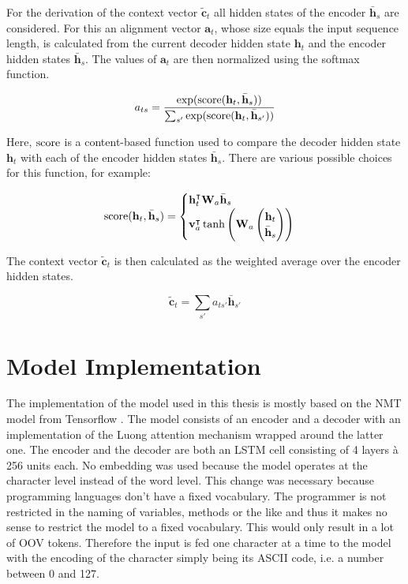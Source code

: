 For the derivation of the context vector \(\tilde{\mathbf{c}}_t\) all hidden states of the encoder \(\bar{\mathbf{h}}_s\) are considered. For this an alignment vector \(\mathbf{a}_t\), whose size equals the input sequence length, is calculated from the current decoder hidden state \(\mathbf{h}_t\) and the encoder hidden states \(\bar{\mathbf{h}}_s\). The values of \(\mathbf{a}_t\) are then normalized using the softmax function.

\begin{equation*}
  a_{ts} = \frac
            {\exp(\operatorname{score}(\mathbf{h}_t, \bar{\mathbf{h}}_s))}
            {\sum_{s'} \exp(\operatorname{score}(\mathbf{h}_t, \bar{\mathbf{h}}_{s'}))}
\end{equation*}

Here, \(\operatorname{score}\) is a content-based function used to compare the decoder hidden state \(\mathbf{h}_t\) with each of the encoder hidden states \(\bar{\mathbf{h}}_s\). There are various possible choices for this function, for example:

\begin{equation*}
  \operatorname{score}(\mathbf{h}_t, \bar{\mathbf{h}}_s) =
  \begin{cases}
    \mathbf{h}_t^\intercal \mathbf{W}_a \bar{\mathbf{h}}_s \\
    \mathbf{v}_a^\intercal \tanh \left(\mathbf{W}_a \begin{pmatrix} \mathbf{h}_t \\ \bar{\mathbf{h}}_s \end{pmatrix} \right)
  \end{cases}
\end{equation*}

The context vector \(\tilde{\mathbf{c}}_t\) is then calculated as the weighted average over the encoder hidden states.

\begin{equation*}
  \tilde{\mathbf{c}}_t = \sum_{s'} a_{ts'} \bar{\mathbf{h}}_{s'}
\end{equation*}

\section{Model Implementation}

The implementation of the model used in this thesis is mostly based on the NMT model from Tensorflow \cite{seq2seq_tutorial}. The model consists of an encoder and a decoder with an implementation of the Luong attention mechanism \cite{attention_luong} wrapped around the latter one. The encoder and the decoder are both an LSTM cell consisting of 4 layers \`a 256 units each. No embedding was used because the model operates at the character level instead of the word level. This change was necessary because programming languages don't have a fixed vocabulary. The programmer is not restricted in the naming of variables, methods or the like and thus it makes no sense to restrict the model to a fixed vocabulary. This would only result in a lot of OOV tokens. Therefore the input is fed one character at a time to the model with the encoding of the character simply being its ASCII code, i.e. a number between 0 and 127.

